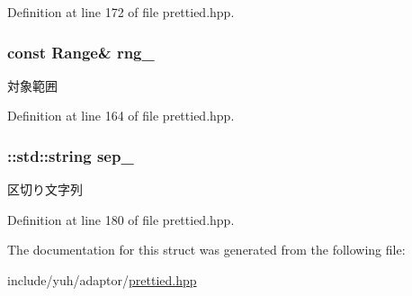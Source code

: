 \-Definition at line 172 of file prettied.\-hpp.

\hypertarget{structyuh_1_1range__detail_1_1range__io_a1dc23cf32ae84636d442489c9629b987}{
\subsubsection[{rng\-\_\-}]{\setlength{\rightskip}{0pt plus 5cm}const \-Range\& {\bf rng\-\_\-}}}\label{da/d75/structyuh_1_1range__detail_1_1range__io_a1dc23cf32ae84636d442489c9629b987}
対象範囲 

\-Definition at line 164 of file prettied.\-hpp.

\hypertarget{structyuh_1_1range__detail_1_1range__io_ae32c4a9c66e100eb1bc143c4e851fb2f}{
\subsubsection[{sep\-\_\-}]{\setlength{\rightskip}{0pt plus 5cm}\-::std\-::string {\bf sep\-\_\-}}}\label{da/d75/structyuh_1_1range__detail_1_1range__io_ae32c4a9c66e100eb1bc143c4e851fb2f}
区切り文字列 

\-Definition at line 180 of file prettied.\-hpp.



\-The documentation for this struct was generated from the following file\-:\begin{DoxyCompactItemize}
\item 
include/yuh/adaptor/\hyperlink{prettied_8hpp}{prettied.\-hpp}\end{DoxyCompactItemize}
